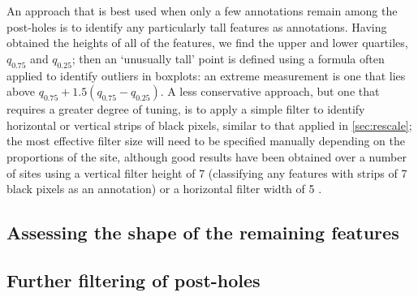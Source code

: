 \documentclass[../../ArchStats.tex]{subfiles}
\begin{document}
An approach that is best used when only a few annotations remain among the post-holes is to identify any particularly tall features as annotations. Having obtained the heights of all of the features, we find the upper and lower quartiles, $q_{0.75}$ and $q_{0.25}$; then an `unusually tall' point is defined using a formula often applied to identify outliers in boxplots: an extreme measurement is one that lies above $q_{0.75} + 1.5(q_{0.75} - q_{0.25})$. A less conservative approach, but one that requires a greater degree of tuning, is to apply a simple filter to identify horizontal or vertical strips of black pixels, similar to that applied in \ref{sec:rescale}; the most effective filter size will need to be specified manually depending on the proportions of the site, although good results have been obtained over a number of sites using a vertical filter height of 7 (classifying any features with strips of 7 black pixels as an annotation) or a horizontal filter width of 5 .

\subsection{Assessing the shape of the remaining features}



\subsection{Further filtering of post-holes}



\end{document}
